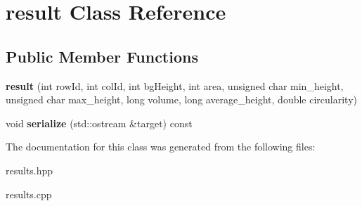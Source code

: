 \hypertarget{classresult}{}\section{result Class Reference}
\label{classresult}
\subsection*{Public Member Functions}
\begin{DoxyCompactItemize}
\item 
\mbox{\label{classresult_a86900b55b332bfb6dd4331ab222f849e}} 
{\bfseries result} (int row\+Id, int col\+Id, int bg\+Height, int area, unsigned char min\+\_\+height, unsigned char max\+\_\+height, long volume, long average\+\_\+height, double circularity)
\item 
\mbox{\label{classresult_ab3dfe0a0a978ed99c3409a453d868a71}} 
void {\bfseries serialize} (std\+::ostream \&target) const
\end{DoxyCompactItemize}


The documentation for this class was generated from the following files\+:\begin{DoxyCompactItemize}
\item 
results.\+hpp\item 
results.\+cpp\end{DoxyCompactItemize}
